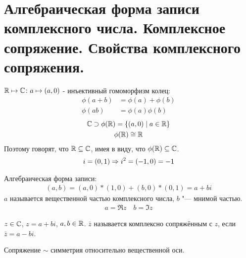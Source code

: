 \section{Алгебраическая форма записи комплексного числа. Комплексное сопряжение. Свойства комплексного сопряжения.}

$\mathbb{R} \mapsto \mathbb{C}\colon a \mapsto (a, 0)$ - инъективный гомоморфизм колец:
\begin{align*}
	\phi(a+b) &= \phi(a) + \phi(b) \\
	\phi(ab) &= \phi(a) \phi(b)
\end{align*}
\begin{gather*}
\mathbb{C} \supset \phi(\mathbb{R}) = \{(a, 0) \mid a \in \mathbb{R}\} \\
\phi(\mathbb{R}) \cong \mathbb{R}
\end{gather*}
Поэтому говорят, что $\mathbb{R} \subseteq \mathbb{C}$, имея в виду, что $\phi(\mathbb{R}) \subseteq \mathbb{C}$.
\begin{gather*}
i = (0, 1) \Rightarrow i^2 = (-1, 0) = -1
\end{gather*}
\begin{Def}
Алгебраическая форма записи:
\begin{gather*}
(a, b) = (a, 0)*(1, 0) + (b, 0)*(0, 1) = a + bi
\end{gather*}
$a$ называется вещественной частью комплексного числа, $b$ "--- мнимой частью.
\begin{gather*}
a = \Re z \quad b = \Im z
\end{gather*}
\end{Def}

\begin{Def}
$z \in \mathbb{C}$, $z = a + bi$, $a, b \in \mathbb{R}$. $\bar z$ называется комплексно сопряжённым с $z$, если $\bar z = a - bi$.
\end{Def}
\begin{Rem}
Сопряжение $\sim$ симметрия относительно вещественной оси.
\begin{center}
\def\svgwidth{6.0cm}

\end{center}
\end{Rem}

